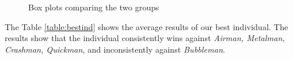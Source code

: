 \intextsep

\begin{figure}[H]%
	\centering
	\qquad
	\caption{Box plots comparing the two groups}
	\label{fig:boxplots}
\end{figure}

The Table \ref{table:bestind} shows the average results of our best individual. The results show that the individual consistently wins against \textit{Airman, Metalman, Crashman,} \textit{Quickman}, and inconsistently against \textit{Bubbleman}.

\intextsep

